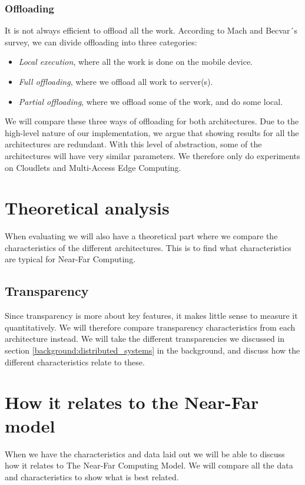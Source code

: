 \subsubsection{Offloading}
It is not always efficient to offload all the work. According to Mach and Becvar´s survey\cite{mach_mobile_2017}, we can divide offloading into three categories:
\begin{itemize}
    \item \textit{Local execution}, where all the work is done on the mobile device.
    \item \textit{Full offloading}, where we offload all work to server(s).
    \item \textit{Partial offloading}, where we offload some of the work, and do some local.
\end{itemize}
We will compare these three ways of offloading for both architectures.
Due to the high-level nature of our implementation, we argue that showing results for all the architectures are redundant. With this level of abstraction, some of the architectures will have very similar parameters. We therefore only do experiments on Cloudlets and Multi-Access Edge Computing.














\section{Theoretical analysis}
When evaluating we will also have a theoretical part where we compare the characteristics of the different architectures. This is to find what characteristics are typical for Near-Far Computing.

\subsection{Transparency}
Since transparency is more about key features, it makes little sense to measure it quantitatively. We will therefore compare transparency characteristics from each architecture instead. We will take the different transparencies we discussed in section \ref{background:distributed_systems} in the background, and discuss how the different characteristics relate to these.




\section{How it relates to the Near-Far model}
When we have the characteristics and data laid out we will be able to discuss how it relates to The Near-Far Computing Model. We will compare all the data and characteristics to show what is best related.









